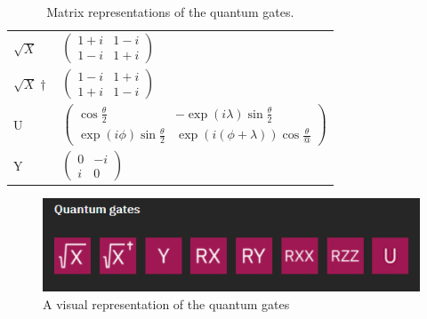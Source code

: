 \begin{table}[]
\begin{tabular}{l|l}
        $\sqrt{X}$                        & $\begin{pmatrix} 1+i&1-i                                                  \\ 1-i&1+i                                                                                                                                                                            \end{pmatrix}$ \\
        $\sqrt{X}\dagger$                 & $\begin{pmatrix} 1-i&1+i                                                  \\ 1+i&1-i                                                                                                                                                                            \end{pmatrix}$ \\
        U                                 & $\begin{pmatrix} \cos\frac{\theta}{2}&-\exp(i\lambda)\sin\frac{\theta}{2} \\ \exp(i\phi)\sin\frac{\theta}{2}&\exp(i(\phi+\lambda))\cos\frac{\theta}{@}                                                                                                          \end{pmatrix}$ \\
        Y                                 & $\begin{pmatrix} 0&-i \\ i&0                                                                                                                                                                                                                                    \end{pmatrix}$                                   
        \end{tabular}
        \caption{Matrix representations of the quantum gates.}
\end{table}

\begin{figure} [h]
    \centering
    \includegraphics[width=\textwidth]{img/quantum-gates.PNG}
        \caption{A visual representation of the quantum gates}
        \label{fig:quantum gates}
\end{figure}


